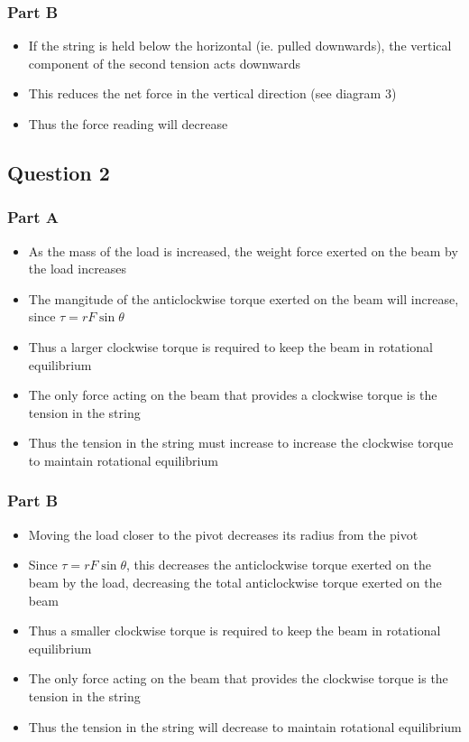 \documentclass[a4paper,11pt]{article}
\begin{document}
\subsubsection{Part B}

\begin{itemize}
\item If the string is held below the horizontal (ie. pulled downwards), the vertical component
of the second tension acts downwards
\item This reduces the net force in the vertical direction (see diagram 3)
\item Thus the force reading will decrease
\end{itemize}


\subsection{Question 2}

\subsubsection{Part A}

\begin{itemize}
\item As the mass of the load is increased, the weight force exerted on the beam by the load increases
\item The mangitude of the anticlockwise torque exerted on the beam will increase, since $\tau = r F \sin{\theta}$
\item Thus a larger clockwise torque is required to keep the beam in rotational equilibrium
\item The only force acting on the beam that provides a clockwise torque is the tension in the string
\item Thus the tension in the string must increase to increase the clockwise torque to maintain rotational equilibrium
\end{itemize}

\subsubsection{Part B}

\begin{itemize}
\item Moving the load closer to the pivot decreases its radius from the pivot
\item Since $\tau = r F \sin{\theta}$, this decreases the anticlockwise torque
exerted on the beam by the load, decreasing the total anticlockwise torque exerted on the beam
\item Thus a smaller clockwise torque is required to keep the beam in rotational equilibrium
\item The only force acting on the beam that provides the clockwise torque is the tension in the string
\item Thus the tension in the string will decrease to maintain rotational equilibrium
\end{itemize}
\end{document}
